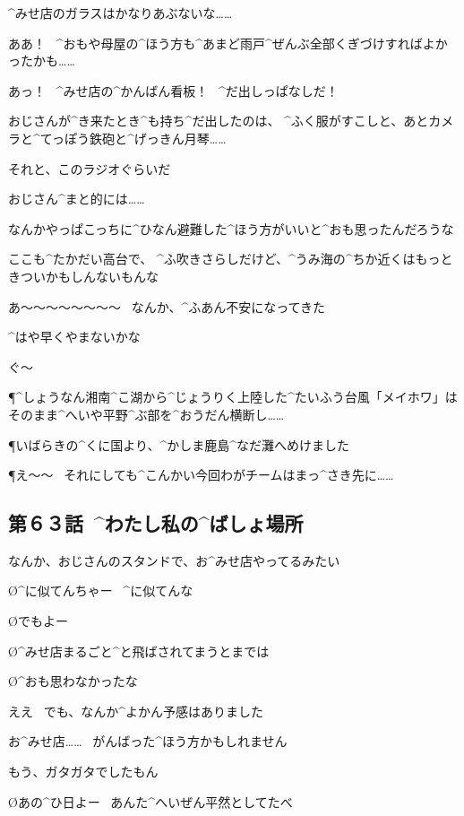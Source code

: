 \A ^{みせ}{店}のガラスはかなりあぶないな……

\A ああ！
\ ^{おもや}{母屋}の^{ほう}{方}も^{あまど}{雨戸}^{ぜんぶ}{全部}くぎづけすればよかったかも……

\A あっ！
\ ^{みせ}{店}の^{かんばん}{看板}！
\ ^{だ}{出}しっぱなしだ！

\A おじさんが^{き}{来}たとき^{も}{持}ち^{だ}{出}したのは、
^{ふく}{服}がすこしと、あとカメラと^{てっぽう}{鉄砲}と^{げっきん}{月琴}……

\A それと、このラジオぐらいだ

\page
\A おじさん^{まと}{的}には……

\A なんかやっぱこっちに^{ひなん}{避難}した^{ほう}{方}がいいと^{おも}{思}ったんだろうな

\A ここも^{たかだい}{高台}で、
^{ふ}{吹}きさらしだけど、^{うみ}{海}の^{ちか}{近}くはもっときついかもしんないもんな

\A あ〜〜〜〜〜〜〜〜
\ なんか、^{ふあん}{不安}になってきた

\A ^{はや}{早}くやまないかな

\A ぐ〜

\page[108]
\P ^{しょうなん}{湘南}^{こ}{湖}から^{じょうりく}{上陸}した^{たいふう}{台風}「メイホワ」は
そのまま^{へいや}{平野}^{ぶ}{部}を^{おうだん}{横断}し……

\P いばらきの^{くに}{国}より、^{かしま}{鹿島}^{なだ}{灘}へめけました

\P え〜〜
\ それにしても^{こんかい}{今回}わがチームはまっ^{さき}{先}に……


\subsection{第６３話\ ^{わたし}{私}の^{ばしょ}{場所}}

\page[118]
\A なんか、おじさんのスタンドで、お^{みせ}{店}やってるみたい

\O ^{に}{似}てんちゃー
\ ^{に}{似}てんな

\O でもよー

\O ^{みせ}{店}まるごと^{と}{飛}ばされてまうとまでは

\O ^{おも}{思}わなかったな

\A ええ
\ でも、なんか^{よかん}{予感}はありました

\page
\A お^{みせ}{店}……
\ がんばった^{ほう}{方}かもしれません

\A もう、ガタガタでしたもん

\O あの^{ひ}{日}よー
\ あんた^{へいぜん}{平然}としてたべ

